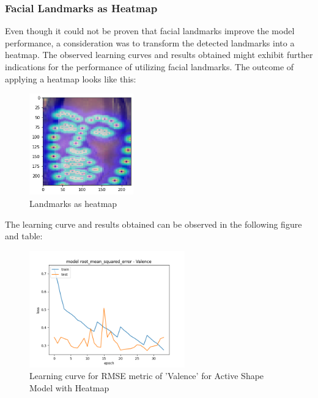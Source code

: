 \subsubsection{Facial Landmarks as Heatmap}
Even though it could not be proven that facial landmarks improve the model performance, a consideration was to transform the detected landmarks into a heatmap. The observed learning curves and results obtained might exhibit further indications for the performance of utilizing facial landmarks. The outcome of applying a heatmap looks like this:

\begin{figure}[H]
  \begin{center}
  \includegraphics[angle=0, width=0.4\textwidth]{Figures/landmarks_as_heatmap.png}
  \caption{Landmarks as heatmap}
  \label{fig:LandmarksHeatmap}
  \end{center}
\end{figure}

The learning curve and results obtained can be observed in the following figure and table:

\begin{figure}[H]
  \begin{center}
  \includegraphics[angle=0, width=0.6\textwidth]{Figures/rmse_out1_heatmap.png}
  \caption{Learning curve for RMSE metric of 'Valence' for Active Shape Model with Heatmap}
  \label{fig:ASMHeatmap}
  \end{center}
\end{figure}

